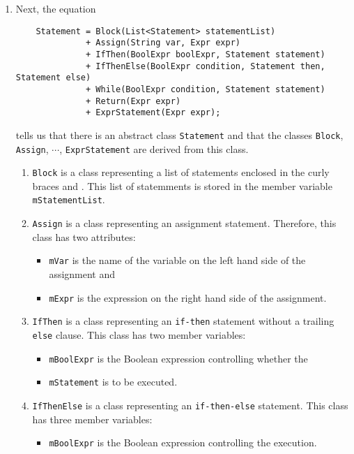 \begin{enumerate}
\item Next, the equation
      \begin{verbatim}
    Statement = Block(List<Statement> statementList)
              + Assign(String var, Expr expr)
              + IfThen(BoolExpr boolExpr, Statement statement)
              + IfThenElse(BoolExpr condition, Statement then, Statement else)
              + While(BoolExpr condition, Statement statement)
              + Return(Expr expr)
              + ExprStatement(Expr expr);
      \end{verbatim}
      tells us that there is an abstract class \texttt{Statement} and that the classes
      \texttt{Block}, \texttt{Assign}, $\cdots$, \texttt{ExprStatement} are derived from
      this class.
      \begin{enumerate}
      \item \texttt{Block} is a class representing a list of statements enclosed in
            the curly braces \squoted{\{} and \squoted{\}}.  This list of statemments is
            stored in the member variable \texttt{mStatementList}.
      \item \texttt{Assign} is a class representing an assignment statement.  Therefore,
            this class has two attributes:
            \begin{itemize}
            \item \texttt{mVar} is the name of the variable on the left hand side of the
                  assignment and
            \item \texttt{mExpr} is the expression on the right hand side of the  assignment.
            \end{itemize}
      \item \texttt{IfThen} is a class representing an \texttt{if-then} statement without
            a trailing \texttt{else} clause.  This class has two member variables:
            \begin{itemize}
            \item \texttt{mBoolExpr} is the Boolean expression controlling whether the
            \item \texttt{mStatement} is to be executed.
            \end{itemize}
      \item \texttt{IfThenElse} is a class representing an \texttt{if-then-else}
            statement. This class has three member variables:
            \begin{itemize}
            \item \texttt{mBoolExpr} is the Boolean expression controlling the execution.

\end{itemize}
\end{enumerate}
\end{enumerate}
